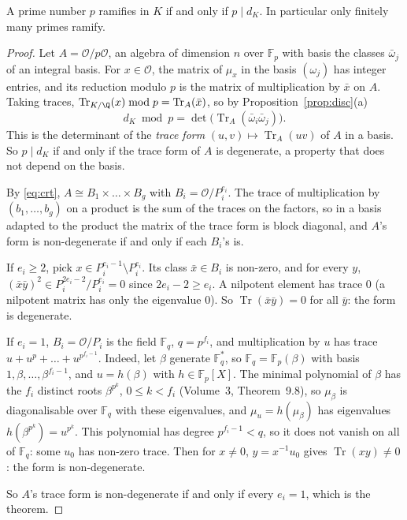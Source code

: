 \begin{theorem}\label{thm:ramdisc}
A prime number $p$ ramifies in $K$ if and only if $p\mid d_K$. In particular only finitely many primes ramify.
\end{theorem}
\begin{proof}
Let $A=\mathcal O/p\mathcal O$, an algebra of dimension $n$ over $\mathbb F_p$ with basis the classes $\bar\omega_j$ of an
integral basis. For $x\in\mathcal O$, the matrix of $\mu_x$ in the basis $(\omega_j)$ has integer entries, and its
reduction modulo $p$ is the matrix of multiplication by $\bar x$ on $A$. Taking traces, $\operatorname{Tr}_{K/\Q}(x)\bmod
p=\operatorname{Tr}_A(\bar x)$, so by Proposition~\ref{prop:disc}(a)
\[
d_K\bmod p=\det\bigl(\operatorname{Tr}_A(\bar\omega_i\bar\omega_j)\bigr).
\]
This is the determinant of the \emph{trace form} $(u,v)\mapsto\operatorname{Tr}_A(uv)$ of $A$ in a basis. So $p\mid
d_K$ if and only if the trace form of $A$ is degenerate, a property that does not depend on the basis.

By \eqref{eq:crt}, $A\cong B_1\times\dots\times B_g$ with $B_i=\mathcal O/P_i^{e_i}$. The trace of multiplication by
$(b_1,\dots,b_g)$ on a product is the sum of the traces on the factors, so in a basis adapted to the product the matrix
of the trace form is block diagonal, and $A$'s form is non-degenerate if and only if each $B_i$'s is.

If $e_i\ge2$, pick $x\in P_i^{e_i-1}\setminus P_i^{e_i}$. Its class $\bar x\in B_i$ is non-zero, and for every $y$,
$(\bar x\bar y)^{2}\in P_i^{2e_i-2}/P_i^{e_i}=0$ since $2e_i-2\ge e_i$. A nilpotent element has trace $0$ (a nilpotent
matrix has only the eigenvalue $0$). So $\operatorname{Tr}(\bar x\bar y)=0$ for all $\bar y$: the form is degenerate.

If $e_i=1$, $B_i=\mathcal O/P_i$ is the field $\mathbb F_{q}$, $q=p^{f_i}$, and multiplication by $u$ has trace
$u+u^p+\dots+u^{p^{f_i-1}}$. Indeed, let $\beta$ generate $\mathbb F_q^*$, so $\mathbb F_q=\mathbb F_p(\beta)$ with basis
$1,\beta,\dots,\beta^{f_i-1}$, and $u=h(\beta)$ with $h\in\mathbb F_p[X]$. The minimal polynomial of $\beta$ has the $f_i$
distinct roots $\beta^{p^k}$, $0\le k<f_i$ (Volume~3, Theorem~9.8), so $\mu_\beta$ is diagonalisable over $\mathbb F_q$ with
these eigenvalues, and $\mu_u=h(\mu_\beta)$ has eigenvalues $h(\beta^{p^k})=u^{p^k}$. This polynomial has degree $p^{f_i-1}<q$, so it does not vanish on all of
$\mathbb F_q$: some $u_0$ has non-zero trace. Then for $x\ne0$, $y=x^{-1}u_0$ gives $\operatorname{Tr}(xy)\ne0$: the form is
non-degenerate.

So $A$'s trace form is non-degenerate if and only if every $e_i=1$, which is the theorem.
\end{proof}

